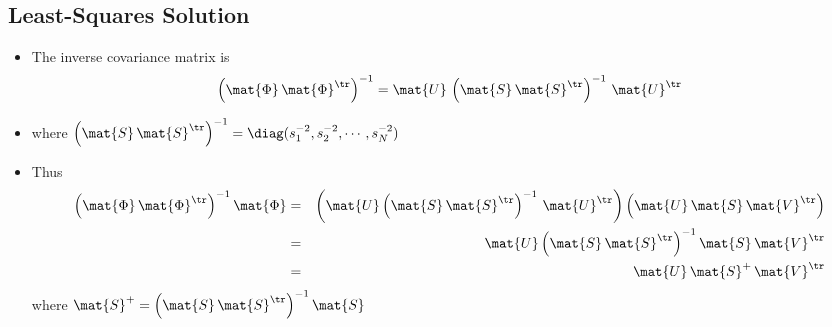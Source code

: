 \begin{slide}
\section[-2]{Least-Squares Solution}

\begin{PauseHighLight}

\begin{itemize}\squeeze
\item The inverse covariance matrix is
  \begin{displaymath}
    \left(\mat{\Phi}\,\mat{\Phi}^\tr\right)^{-1} = \mat{U}\,
    \left(\mat{S}\,\mat{S}^\tr\right)^{-1}\, \mat{U}^\tr
  \end{displaymath}
\item where $\left(\mat{S}\,\mat{S}^\tr \right)^{-1} = \diag(s_1^{-2},
  s_2^{-2}, \cdots, s_N^{-2})$\pause
\item Thus
  \begin{eqnarray*}
    \left(\mat{\Phi}\,\mat{\Phi}^\tr\right)^{-1}
    \mat{\Phi}
    &=& \left(\mat{U}
      \left(\mat{S}\,\mat{S}^\tr\right)^{-1}\, \mat{U}^\tr\right)
    \left(\mat{U}\, \mat{S} \, \mat{V}^\tr \right) \\
    &=& \mat{U}\left(\mat{S}\,\mat{S}^\tr\right)^{-1}  \mat{S}\,
    \mat{V}^\tr \\
    &=& \mat{U} \, \mat{S}^{+}\, \mat{V}^\tr
  \end{eqnarray*}
where $\mat{S}^{+} = \left(\mat{S}\,\mat{S}^\tr\right)^{-1}
\mat{S}$\pause 
\end{itemize}

\end{PauseHighLight}
\end{slide}


